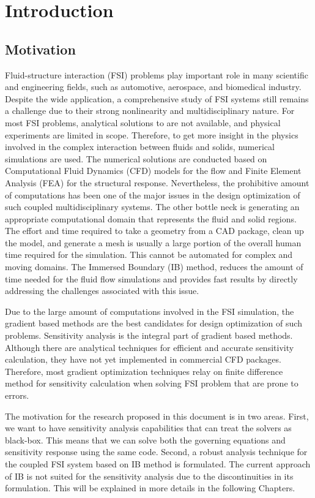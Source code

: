 \chapter{Introduction}
\section{Motivation}
Fluid-structure interaction (FSI) problems play important role in many scientific and engineering fields, such as automotive, aerospace, and biomedical industry. Despite the wide application, a comprehensive study of FSI systems still remains a challenge due to their strong nonlinearity and multidisciplinary nature. For most FSI problems, analytical solutions to are not available, and physical experiments are limited in scope. Therefore, to get more insight in the physics involved in the complex interaction between fluids and solids, numerical simulations are used. The numerical solutions are conducted based on Computational Fluid Dynamics (CFD) models for the flow and Finite Element Analysis (FEA) for the structural response. Nevertheless, the prohibitive amount of computations has been one of the major issues in the design optimization of such coupled multidisciplinary systems. The other bottle neck is generating an appropriate computational domain that represents the fluid and solid regions. The effort and time required to take a geometry from a CAD package, clean up the model, and generate a mesh is usually a large portion of the overall human time required for the simulation. This cannot be automated for complex and moving domains. The Immersed Boundary (IB) method, reduces the amount of time needed for the fluid flow simulations and provides fast results by directly addressing the challenges associated with this issue.

Due to the large amount of computations involved in the FSI simulation, the gradient based methods are the best candidates for design optimization of such problems. Sensitivity analysis is the integral part of gradient based methods. Although there are analytical techniques for efficient and accurate sensitivity calculation, they have not yet implemented in commercial CFD packages. Therefore, most gradient optimization techniques relay on finite difference method for sensitivity calculation when solving FSI problem that are prone to errors.

The motivation for the research proposed in this document is in two areas. First, we want to have sensitivity analysis capabilities that can treat the solvers as black-box. This means that we can solve both the governing equations and sensitivity response using the same code. Second, a robust analysis technique for the coupled FSI system based on IB method is formulated. The current approach of IB is not suited for the sensitivity analysis due to the discontinuities in its formulation. This will be explained in more details in the following Chapters.

